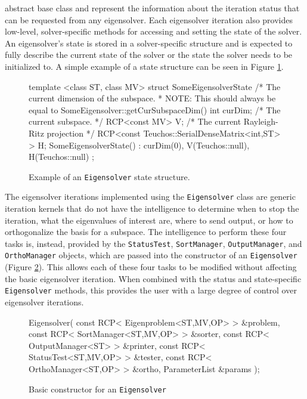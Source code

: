 \documentclass[acmtoms]{acmtrans2m}
\newcommand{\aspace}[1]{\texttt{#1}}
\begin{document}
abstract base class and represent the information about the iteration status that can 
be requested from any eigensolver.  Each eigensolver iteration also provides low-level, 
solver-specific methods for accessing and setting the state of the solver.  
An eigensolver's state is stored in a solver-specific structure and is expected to fully describe 
the current state of the solver or the state the solver needs to be initialized to.  
A simple example of a state structure can be seen in Figure \ref{fig:state}.
\begin{figure}[htb]
\begin{center}
\begin{boxedverbatim}
  template <class ST, class MV>
  struct SomeEigensolverState {
    /* The current dimension of the subspace.
     * NOTE: This should always be equal to SomeEigensolver::getCurSubspaceDim()
    int curDim;
    /* The current subspace. */
    RCP<const MV> V;
    /* The current Rayleigh-Ritz projection */
    RCP<const Teuchos::SerialDenseMatrix<int,ST> > H;
    SomeEigensolverState() : curDim(0), V(Teuchos::null),
                             H(Teuchos::null) {}	
  };
\end{boxedverbatim}
\end{center}
\caption{Example of an \aspace{Eigensolver} state structure.}
\label{fig:state}
\end{figure}

The eigensolver iterations implemented using the \aspace{Eigensolver} class
are generic iteration kernels that do not have the intelligence to determine when
to stop the iteration, what the eigenvalues of interest are, where to send output,
or how to orthogonalize the basis for a subspace.  The intelligence to perform these four
tasks is, instead, provided by the \aspace{StatusTest}, \aspace{SortManager},
\aspace{OutputManager}, and \aspace{OrthoManager} objects, which are passed into the
constructor of an \aspace{Eigensolver} (Figure \ref{fig:constructor}).  This allows 
each of these four tasks to be modified without affecting the basic eigensolver 
iteration. When combined with the status and state-specific \aspace{Eigensolver} 
methods, this provides the user with a large degree of control over eigensolver iterations.
\begin{figure}[htb]
\begin{center}
\begin{boxedverbatim}
Eigensolver(
   const RCP< Eigenproblem<ST,MV,OP> > &problem,
   const RCP< SortManager<ST,MV,OP>  > &sorter,
   const RCP< OutputManager<ST>      > &printer,
   const RCP< StatusTest<ST,MV,OP>   > &tester,
   const RCP< OrthoManager<ST,OP>    > &ortho,
   ParameterList                       &params
 );
\end{boxedverbatim}
\end{center}
\caption{Basic constructor for an \aspace{Eigensolver}}
\label{fig:constructor}
\end{figure}
\end{document}
